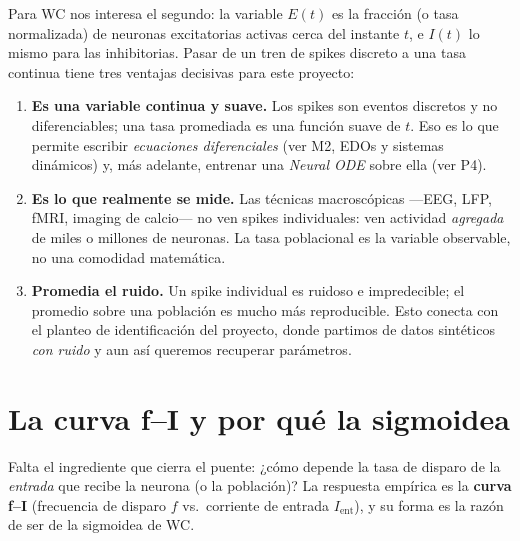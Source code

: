 \documentclass[11pt,a4paper]{article}
\begin{document}
Para WC nos interesa el segundo: la variable $E(t)$ es la fracción (o tasa
normalizada) de neuronas excitatorias activas cerca del instante $t$, e $I(t)$
lo mismo para las inhibitorias. Pasar de un tren de spikes discreto a una tasa
continua tiene tres ventajas decisivas para este proyecto:

\begin{enumerate}[nosep]
  \item \textbf{Es una variable continua y suave.} Los spikes son eventos
  discretos y no diferenciables; una tasa promediada es una función suave de
  $t$. Eso es lo que permite escribir \emph{ecuaciones diferenciales}
  (ver M2, EDOs y sistemas dinámicos) y, más adelante, entrenar una
  \emph{Neural ODE} sobre ella (ver P4).
  \item \textbf{Es lo que realmente se mide.} Las técnicas macroscópicas
  ---EEG, LFP, fMRI, imaging de calcio--- no ven spikes individuales: ven
  actividad \emph{agregada} de miles o millones de neuronas. La tasa
  poblacional es la variable observable, no una comodidad matemática.
  \item \textbf{Promedia el ruido.} Un spike individual es ruidoso e
  impredecible; el promedio sobre una población es mucho más reproducible. Esto
  conecta con el planteo de identificación del proyecto, donde partimos de
  datos sintéticos \emph{con ruido} y aun así queremos recuperar parámetros.
\end{enumerate}

\section{La curva f--I y por qué la sigmoidea}
\label{sec:fi}

Falta el ingrediente que cierra el puente: ¿cómo depende la tasa de disparo de
la \emph{entrada} que recibe la neurona (o la población)? La respuesta empírica
es la \textbf{curva f--I} (frecuencia de disparo $f$ vs.\ corriente de entrada
$I_{\text{ent}}$), y su forma es la razón de ser de la sigmoidea de WC.
\end{document}

